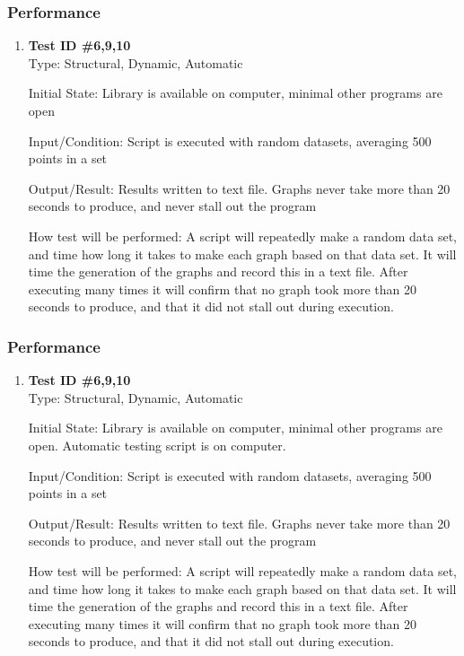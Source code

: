 \documentclass[12pt, titlepage]{article}
\begin{document}
 \subsubsection{Performance}
\begin{enumerate}
\item{\textbf{Test ID \#6,9,10 \\}}
Type: Structural, Dynamic, Automatic
					
Initial State:    Library is available on computer, minimal other programs are open
					
Input/Condition: Script is executed with random datasets, averaging 500 points in a set
					
Output/Result: Results written to text file. Graphs never take more than 20 seconds to produce, and never stall out the program
					
How test will be performed: A script will repeatedly make a random data set, and time how long it takes to make each graph based on that data set. It will time the generation of the graphs and record this in a text file. After executing many times it will confirm that no graph took more than 20 seconds to produce, and that it did not stall out during execution.

 \end{enumerate} 
 
  \subsubsection{Performance}
\begin{enumerate}
\item{\textbf{Test ID \#6,9,10 \\}}
Type: Structural, Dynamic, Automatic
					
Initial State:    Library is available on computer, minimal other programs are open. Automatic testing script is on computer.
					
Input/Condition: Script is executed with random datasets, averaging 500 points in a set
					
Output/Result: Results written to text file. Graphs never take more than 20 seconds to produce, and never stall out the program
					
How test will be performed: A script will repeatedly make a random data set, and time how long it takes to make each graph based on that data set. It will time the generation of the graphs and record this in a text file. After executing many times it will confirm that no graph took more than 20 seconds to produce, and that it did not stall out during execution.

 \end{enumerate} 
 
\end{document}
